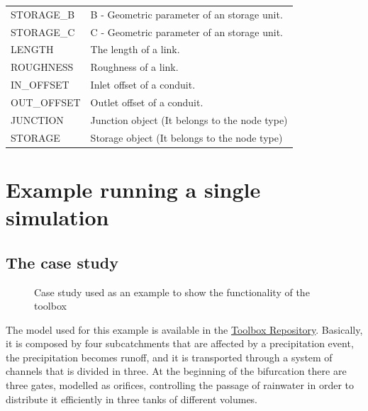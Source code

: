 \documentclass[11pt, letterpaper]{article}
\begin{document}
\begin{center}
\begin{table}
\begin{adjustbox}{center}
\begin{tabular}{ |l|l| }
	STORAGE\_B & B - Geometric parameter of an storage unit. \\
	STORAGE\_C & C - Geometric parameter of an storage unit. \\
	LENGTH & The length of a link. \\
	ROUGHNESS & Roughness of a link. \\
	IN\_OFFSET & Inlet offset of a conduit. \\
	OUT\_OFFSET & Outlet offset of a conduit. \\
	JUNCTION & Junction object (It belongs to the node type) \\
	STORAGE & Storage object (It belongs to the node type) \\
	\hline 
\end{tabular}
\end{adjustbox}
\end{table}
\end{center}

\section{Example running a single simulation}
\subsection{The case study}

\begin{figure}[!ht]
\begin{center}
\caption{Case study used as an example to show the functionality of the toolbox}
\label{fig:model}
\end{center}
\end{figure}
\setlength\parindent{0pt}
The model used for this example is available in the \textcolor{blue}{\href{https://bitbucket.org/swmmtoolbox001}{Toolbox Repository}}. Basically, it is composed by four subcatchments that are affected by a precipitation event, the precipitation becomes runoff, and it is transported through a system of channels that is divided in three. At the beginning of the bifurcation there are three gates, modelled as orifices, controlling the passage of rainwater in order to distribute it efficiently in three tanks of different volumes.
\end{document}
